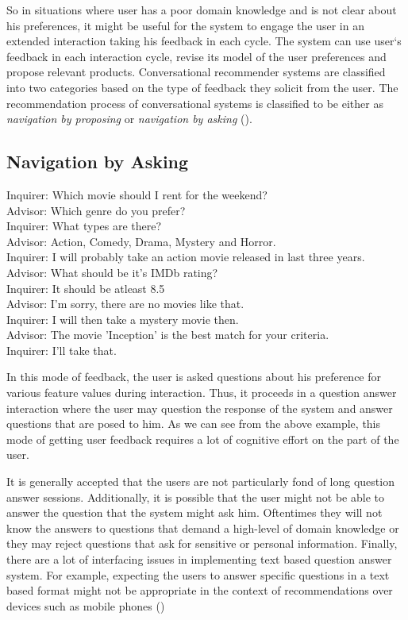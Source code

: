So in situations where user has a poor domain knowledge and is not clear about his preferences, it might be useful for the system to engage the user in an extended interaction taking his feedback in each cycle.
The system can use user`s feedback in each interaction cycle, revise its model of the user preferences and propose relevant products.
Conversational recommender systems are classified into two categories based on the type of feedback they solicit from the user.
The recommendation process of conversational systems is classified to be either as \textit{navigation by proposing} or \textit{navigation by asking} (\cite{shimazu01}).

\subsection{Navigation by Asking}
\begin{mdframed}
%
Inquirer:  Which movie should I rent for the weekend?\\
Advisor:   Which genre do you prefer? \\
Inquirer:  What types are there? \\
Advisor:   Action, Comedy, Drama, Mystery and Horror. \\
Inquirer:  I will probably take an action movie released in last three years. \\
Advisor:   What should be it's IMDb rating?\\
Inquirer:  It should be atleast 8.5 \\
Advisor: I'm sorry, there are no movies like that. \\
Inquirer:  I will then take a mystery movie then. \\
Advisor:  The movie 'Inception' is the best match for your criteria. \\
Inquirer:  I'll take that. \\
\end{mdframed}

In this mode of feedback, the user is asked questions about his preference for various feature values during interaction.
Thus, it proceeds in a question answer interaction where the user may question the response of the system and answer questions that are posed to him.
As we can see from the above example, this mode of getting user feedback requires a lot of cognitive effort on the part of the user.

It is generally accepted that the users are not particularly fond of long question answer sessions. 
Additionally, it is possible that the user might not be able to answer the question that the system might ask him. 
Oftentimes they will not know the answers to questions that demand a high-level of domain knowledge or they may reject questions that ask for sensitive or personal information.
Finally, there are a lot of interfacing issues in implementing text based question answer system. 
For example, expecting the users to answer specific questions in a text based format might not be appropriate in the context of recommendations over devices such as mobile phones (\cite{smyth2007})





